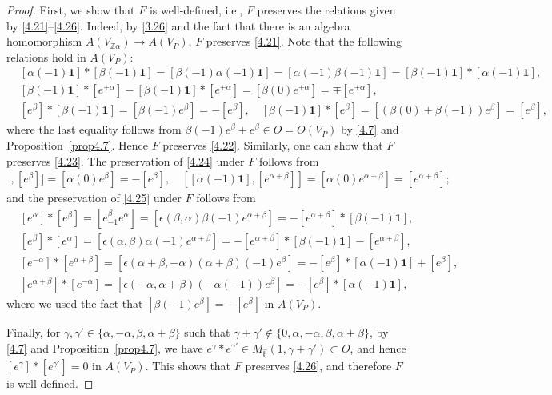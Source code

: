 \documentclass[12pt,a4paper,reqno]{amsart}
\numberwithin{equation}{section}
\numberwithin{equation}{section}
\theoremstyle{definition}
\newcommand{\Z}{\mathbb{Z}}
\def \al{\alpha}
\def \ga {\gamma}
\def \b {\beta}
\def \vac {\mathbf{1}}
\def \h {\mathfrak{h}}
\begin{document}
	\begin{proof}
		First, we show that $F$ is well-defined, i.e., $F$ preserves the relations given by \eqref{4.21}--\eqref{4.26}. Indeed, by \eqref{3.26} and the fact that there is an algebra homomorphism $A(V_{\Z\al})\to A(V_P)$, $F$ preserves \eqref{4.21}. Note that the following relations hold in $A(V_P)$:
		\begin{align*}
			&[\al(-1)\vac]\ast[\b(-1)\vac]=[\b(-1)\al(-1)\vac]=[\al(-1)\b(-1)\vac]=[\b(-1)\vac]\ast[\al(-1)\vac],\\
			& [\b(-1)\vac] \ast [e^{\pm \al}]-[\b(-1)\vac]\ast[e^{\pm \al}]=[\b(0)e^{\pm \al}]=\mp [e^{\pm\al}],\\
			& [e^\b]\ast [\b(-1)\vac]=[\b(-1)e^\b]=-[e^\b],\quad [\b(-1)\vac]\ast [e^\b]=[(\b(0)+\b(-1))e^\b]=[e^\b],
		\end{align*}
		where the last equality follows from $\b(-1)e^\b+e^\b\in O=O(V_P)$ by \eqref{4.7} and Proposition~\ref{prop4.7}. Hence $F$ preserves \eqref{4.22}. Similarly, one can show that $F$ preserves \eqref{4.23}. The preservation of \eqref{4.24} under $F$ follows from 
		\begin{align*}
			[[\al(-1)\vac], [e^\b]]=[\al(0)e^\b]=-[e^\b],\quad [[\al(-1)\vac], [e^{\al+\b}]]=[\al(0)e^{\al+\b}]=[e^{\al+\b}];
		\end{align*} 
		and the preservation of \eqref{4.25} under $F$ follows from 
		\begin{align*}
			&[e^\al]\ast[e^\b]=[e^\b_{-1}e^\al]=[\epsilon(\b,\al)\b(-1)e^{\al+\b}]=-[e^{\al+\b}]\ast [\b(-1)\vac],\\
			&[e^\b]\ast [e^\al]=[\epsilon(\al,\b)\al(-1)e^{\al+\b}]=-[e^{\al+\b}]\ast [\b(-1)\vac]-[e^{\al+\b}],\\
			& [e^{-\al}]\ast [e^{\al+\b}]=[\epsilon(\al+\b,-\al)(\al+\b)(-1)e^{\b}]=-[e^\b]\ast[\al(-1)\vac]+[e^\b],\\
			& [e^{\al+\b}]\ast [e^{-\al}]=[\epsilon(-\al,\al+\b)(-\al(-1))e^\b]=-[e^\b]\ast[\al(-1)\vac],
		\end{align*}
		where we used the fact that $[\b(-1)e^\b]=-[e^\b]$ in $A(V_P)$. 
		
		Finally, for $\ga,\ga'\in \{ \al,-\al,\b,\al+\b\}$ such that $\ga+\ga'\notin \{0,\al,-\al,\b,\al+\b\}$, by \eqref{4.7} and Proposition~\ref{prop4.7}, we have 
		$e^\ga\ast e^{\ga'}\in M_{\hat{\h}}(1,\ga+\ga')\subset O$, and hence $[e^\ga]\ast[e^{\ga'}]=0$ in $A(V_P)$. This shows that $F$ preserves \eqref{4.26}, and therefore $F$ is well-defined.
		

\end{proof}
\end{document}
